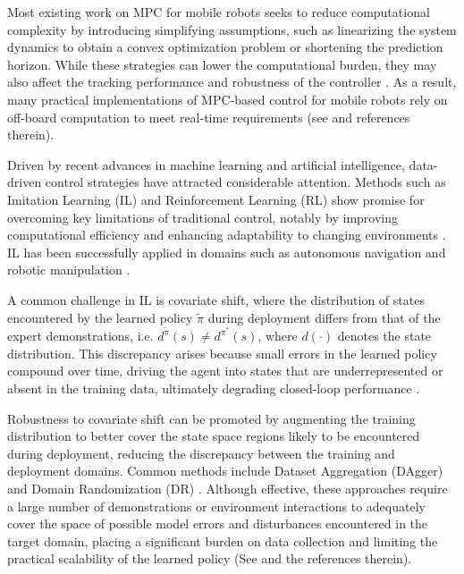 \documentclass[letterpaper, 10 pt, conference]{ieeeconf}
\begin{document}
Most existing work on MPC for mobile robots seeks to reduce computational complexity by introducing simplifying assumptions, such as linearizing the system dynamics to obtain a convex optimization problem or shortening the prediction horizon. While these strategies can lower the computational burden, they may also affect the tracking performance and robustness of the controller \cite{gros2020linear}. As a result, many practical implementations of MPC-based control for mobile robots rely on off-board computation to meet real-time requirements (see \cite{MPC_robotica} and references therein).

Driven by recent advances in machine learning and artificial intelligence, data-driven control strategies have attracted considerable attention. Methods such as Imitation Learning (IL) and Reinforcement Learning (RL) show promise for overcoming key limitations of traditional control, notably by improving computational efficiency and enhancing adaptability to changing environments \cite{brunke2022safe,imitation_survey_2}. IL has been successfully applied in domains such as autonomous navigation \cite{bc_nav_5,BC_nav_1,BC_nav_2,bc_nav_3,bc_nav_4,bc_nav_6} and robotic manipulation \cite{BC_arm_1,BC_arm_2,BC_arm_3,BC_arm_4}.

A common challenge in IL is covariate shift, where the distribution of states encountered by the learned policy $\tilde{\pi}$ during deployment differs from that of the expert demonstrations, i.e. $d^{\tilde{\pi}}(s) \neq d^{\pi^*}(s)$, where $d(\cdot)$ denotes the state distribution. This discrepancy arises because small errors in the learned policy compound over time, driving the agent into states that are underrepresented or absent in the training data, ultimately degrading closed-loop performance \cite{dagger}.

Robustness to covariate shift can be promoted by augmenting the training distribution to better cover the state space regions likely to be encountered during deployment, reducing the discrepancy between the training and deployment domains. Common methods include Dataset Aggregation (DAgger) \cite{dagger} and Domain Randomization (DR) \cite{peng2018sim}.   Although effective, these approaches require a large number of demonstrations or environment interactions to adequately cover the space of possible model errors and disturbances encountered in the target domain, placing a significant burden on data collection and limiting the practical scalability of the learned policy (See \cite{tagliabue2024efficient} and the references therein).
\end{document}
